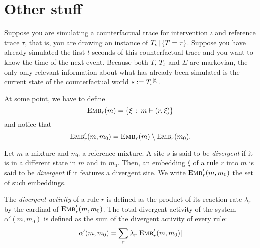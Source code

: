 \section*{Other stuff}

Suppose you are simulating a counterfactual trace for intervention
$\iota$ and reference trace $\tau$, that is, you are drawing an
instance of ${T_\iota\,|\,\{T=\tau\}}{}$. Suppose you have already simulated the first
$t$ seconds of this counterfactual trace and you want to know the time
of the next event. Because both $T$, ${T_\iota}{}$ and $\Sigma$ are
markovian, the only only relevant information about what has already
been simulated is the current state of the counterfactual world
$s := {T_\iota}{}^{[t]}$.

At some point, we have to define
\[{\textsc{Emb}}_{r}(m) = \{ \xi \,:\, m \vdash (r, \xi) \}\]
and notice that
\[{\textsc{Emb}}'_{r}(m, m_0) = {\textsc{Emb}}_{r}(m) \setminus {\textsc{Emb}}_{r}(m_0).\]


\begin{definition}
  Let $m$ a mixture and $m_0$ a reference mixture. A site $s$ is said
  to be \emph{divergent} if it is in a different state in $m$ and in
  $m_0$.  Then, an embedding $\xi$ of a rule $r$ into $m$ is said to
  be \emph{divergent} if it features a divergent site. We write
  ${\textsc{Emb}}'_{r}(m, m_0)$ the set of such embeddings.
\end{definition}

\begin{definition}
  The \emph{divergent activity} of a rule $r$ is defined as the
  product of its reaction rate $\lambda_r$ by the cardinal of
  ${\textsc{Emb}}'_{r}(m, m_0)$.  The total divergent activity of the system
  $\alpha'(m, m_0)$ is defined as the sum of the divergent activity of
  every rule:
  \[\alpha'(m, m_0) = \sum_r \lambda_r |{\textsc{Emb}}'_{r}(m, m_0)| \]
\end{definition}